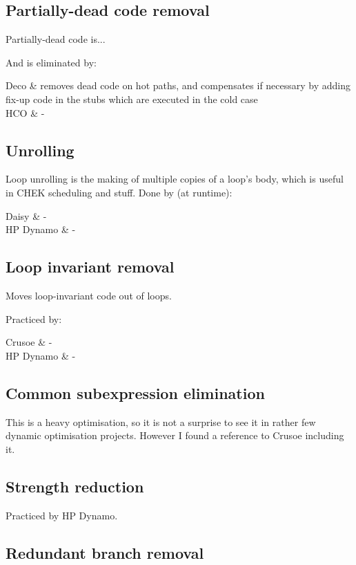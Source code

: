 \subsection{Partially-dead code removal}

Partially-dead code is...

And is eliminated by:

\multinamedstart
Deco & removes dead code on hot paths, and compensates if necessary by adding fix-up code in the stubs which are executed in the cold case \\
HCO & - \\
\multinamedend

\subsection{Unrolling}

Loop unrolling is the making of multiple copies of a loop's body, which is useful in CHEK scheduling and stuff. Done by (at runtime):

\multinamedstart
Daisy & - \\
HP Dynamo & - \\
\multinamedend

\subsection{Loop invariant removal}

Moves loop-invariant code out of loops.

Practiced by:

\multinamedstart
Crusoe & - \\
HP Dynamo & - \\
\multinamedend

\subsection{Common subexpression elimination}

This is a heavy optimisation, so it is not a surprise to see it in rather few dynamic optimisation projects. However I found a reference to Crusoe including it.

\subsection{Strength reduction}

Practiced by HP Dynamo.

\subsection{Redundant branch removal}

